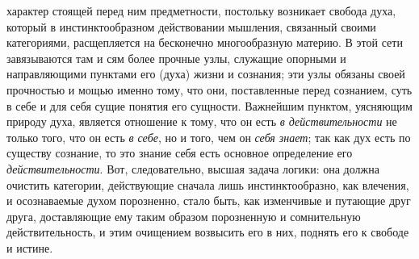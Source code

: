 характер стоящей перед ним предметности, постольку возникает свобода духа,
который в инстинктообразном действовании мышления, связанный своими
категориями, расщепляется на бесконечно многообразную материю. В этой сети
завязываются там и сям более прочные узлы, служащие опорными и
направляющими пунктами его (духа) жизни и сознания; эти узлы обязаны своей
прочностью и мощью именно тому, что они, поставленные перед сознанием, суть
в себе и для себя сущие понятия его сущности. Важнейшим пунктом, уясняющим
природу духа, является отношение к тому, что он есть
{\em в действительности} не только того, что он есть
{\em в себе}, но и того, чем он
{\em себя знает}; так как дух есть по существу
сознание, то это знание себя есть основное определение его
{\em действительности}. Вот, следовательно, высшая
задача логики: она должна очистить категории, действующие сначала лишь
инстинктообразно, как влечения, и осознаваемые духом порозненно, стало
быть, как изменчивые и путающие друг друга, доставляющие ему таким образом
порозненную и сомнительную действительность, и этим очищением возвысить его
в них, поднять его к свободе и истине.

